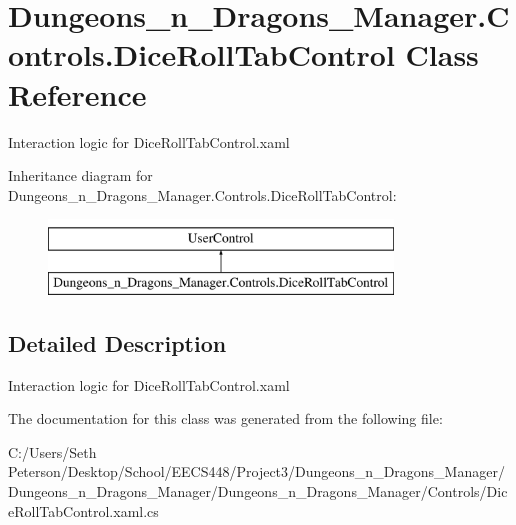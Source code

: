 \hypertarget{class_dungeons__n___dragons___manager_1_1_controls_1_1_dice_roll_tab_control}{}\section{Dungeons\+\_\+n\+\_\+\+Dragons\+\_\+\+Manager.\+Controls.\+Dice\+Roll\+Tab\+Control Class Reference}
\label{class_dungeons__n___dragons___manager_1_1_controls_1_1_dice_roll_tab_control}


Interaction logic for Dice\+Roll\+Tab\+Control.\+xaml  


Inheritance diagram for Dungeons\+\_\+n\+\_\+\+Dragons\+\_\+\+Manager.\+Controls.\+Dice\+Roll\+Tab\+Control\+:\begin{figure}[H]
\begin{center}
\leavevmode
\includegraphics[height=2.000000cm]{class_dungeons__n___dragons___manager_1_1_controls_1_1_dice_roll_tab_control}
\end{center}
\end{figure}


\subsection{Detailed Description}
Interaction logic for Dice\+Roll\+Tab\+Control.\+xaml 



The documentation for this class was generated from the following file\+:\begin{DoxyCompactItemize}
\item 
C\+:/\+Users/\+Seth Peterson/\+Desktop/\+School/\+E\+E\+C\+S448/\+Project3/\+Dungeons\+\_\+n\+\_\+\+Dragons\+\_\+\+Manager/\+Dungeons\+\_\+n\+\_\+\+Dragons\+\_\+\+Manager/\+Dungeons\+\_\+n\+\_\+\+Dragons\+\_\+\+Manager/\+Controls/Dice\+Roll\+Tab\+Control.\+xaml.\+cs\end{DoxyCompactItemize}
